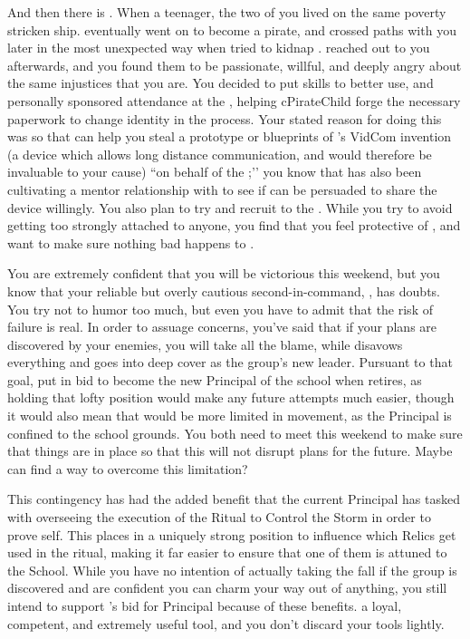 \documentclass[char]{GL2020}
\begin{document}
And then there is \cPirateChild{}. When \cPirateChild{\they} \cPirateChild{\were} a teenager, the two of you lived on the same poverty stricken ship. \cPirateChild{} eventually went on to become a pirate, and crossed paths with you later in the most unexpected way when \cPirateChild{\they} tried to kidnap \cHeadDiplomat{}. \cPirateChild{\They} reached out to you afterwards, and you found them to be passionate, willful, and deeply angry about the same injustices that you are. You decided to put \cPirateChild{\their} skills to better use, and personally sponsored \cPirateChild{\their} attendance at the \pSchool{}, helping cPirateChild{\them} forge the necessary paperwork to change \cPirateChild{\their} identity in the process. Your stated reason for doing this was so that \cPirateChild{\they} can help you steal a prototype or blueprints of \cTechStar{\full}’s VidCom invention (a device which allows long distance communication, and would therefore be invaluable to your cause) ``on behalf of the \pShip{};’’ you know that \cChupInventor{} has also been cultivating a mentor relationship with \cTechStar{} to see if \cTechStar{\they} can be persuaded to share the device willingly. You also plan to try and recruit \cPirateChild{} to the \pGoaties{}. While you try to avoid getting too strongly attached to anyone, you find that you feel protective of \cPirateChild{\them}, and want to make sure nothing bad happens to \cPirateChild{\them}. 

You are extremely confident that you will be victorious this weekend, but you know that your reliable but overly cautious second-in-command, \cChupSecond{}, has doubts. You try not to humor \cChupSecond{\them} too much, but even you have to admit that the risk of failure is real. In order to assuage \cChupSecond{\their} concerns, you've said that if your plans are discovered by your enemies, you will take all the blame, while \cChupSecond{} disavows everything and goes into deep cover as the group's new leader. Pursuant to that goal, \cChupSecond{\they} put in \cChupSecond{\their} bid to become the new Principal of the school when \cPrincipal{\full} retires, as holding that lofty position would make any future attempts much easier, though it would also mean that \cChupSecond{} would be more limited in movement, as the Principal is confined to the school grounds. You both need to meet this weekend to make sure that things are in place so that this will not disrupt plans for the future. Maybe \cGenesis{} can find a way to overcome this limitation?

This contingency has had the added benefit that the current Principal has tasked \cChupSecond{} with overseeing the execution of the Ritual to Control the Storm in order to prove \cChupSecond{\them}self. This places \cChupSecond{\them} in a uniquely strong position to influence which Relics get used in the ritual, making it far easier to ensure that one of them is attuned to the School. While you have no intention of actually taking the fall if the group is discovered and are confident you can charm your way out of anything, you still intend to support \cChupSecond{}’s bid for Principal because of these benefits. \cChupSecond{\They} \cChupSecond{\are} a loyal, competent, and extremely useful tool, and you don’t discard your tools lightly.
\end{document}
